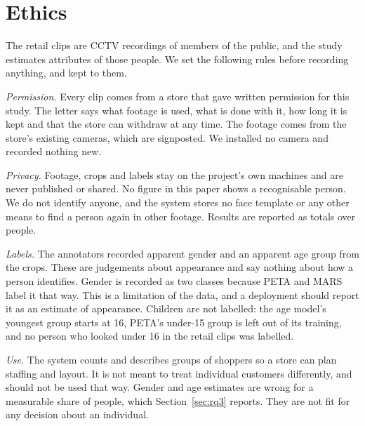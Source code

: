 
\section{Ethics}
\label{sec:ethics}
The retail clips are CCTV recordings of members of the public, and the study
estimates attributes of those people. We set the following rules before
recording anything, and kept to them.

\emph{Permission.} Every clip comes from a store that gave written permission
for this study. The letter says what footage is used, what is done with it, how
long it is kept and that the store can withdraw at any time. The footage comes
from the store's existing cameras, which are signposted. We installed no camera
and recorded nothing new.

\emph{Privacy.} Footage, crops and labels stay on the project's own machines and
are never published or shared. No figure in this paper shows a recognisable
person. We do not identify anyone, and the system stores no face template or
any other means to find a person again in other footage. Results are reported
as totals over people.

\emph{Labels.} The annotators recorded apparent gender and an apparent age group
from the crops. These are judgements about appearance and say nothing about how
a person identifies. Gender is recorded as two classes because PETA and MARS
label it that way. This is a limitation of the data, and a deployment should
report it as an estimate of appearance. Children are not labelled: the age
model's youngest group starts at 16, PETA's under-15 group is left out of its
training, and no person who looked under 16 in the retail clips was labelled.

\emph{Use.} The system counts and describes groups of shoppers so a store can
plan staffing and layout. It is not meant to treat individual customers
differently, and should not be used that way. Gender and age estimates are
wrong for a measurable share of people, which Section~\ref{sec:rq3} reports.
They are not fit for any decision about an individual.
